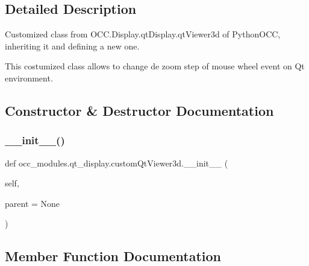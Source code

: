\subsection{Detailed Description}
Customized class from O\+C\+C.\+Display.\+qt\+Display.\+qt\+Viewer3d of Python\+O\+CC, inheriting it and defining a new one. 

This costumized class allows to change de zoom step of mouse wheel event on Qt environment. 

\subsection{Constructor \& Destructor Documentation}
\hypertarget{classocc__modules_1_1qt__display_1_1custom_qt_viewer3d_aeef3c40364ac364d1ffc5ba3f5122964}{}\label{classocc__modules_1_1qt__display_1_1custom_qt_viewer3d_aeef3c40364ac364d1ffc5ba3f5122964} 
\subsubsection{\texorpdfstring{\+\_\+\+\_\+init\+\_\+\+\_\+()}{\_\_init\_\_()}}
{\footnotesize\ttfamily def occ\+\_\+modules.\+qt\+\_\+display.\+custom\+Qt\+Viewer3d.\+\_\+\+\_\+init\+\_\+\+\_\+ (\begin{DoxyParamCaption}\item[{}]{self,  }\item[{}]{parent = {\ttfamily None} }\end{DoxyParamCaption})}



\subsection{Member Function Documentation}
\hypertarget{classocc__modules_1_1qt__display_1_1custom_qt_viewer3d_a2031b7d19b3a0c4b0f54fc90218bcdd8}{}\label{classocc__modules_1_1qt__display_1_1custom_qt_viewer3d_a2031b7d19b3a0c4b0f54fc90218bcdd8} 
